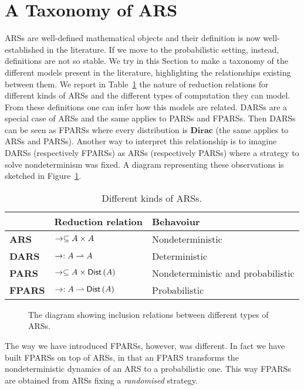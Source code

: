\section{A Taxonomy of ARS}
ARSs are well-defined mathematical objects and their definition is now well-established in the literature. If we move to the probabilistic setting, instead, definitions are not so stable. We try in this Section to make a taxonomy of the different models present in the literature, highlighting the relationships existing between them. We report in Table~\ref{table:ars} the nature of reduction relations for different kinds of ARSs and the different types of computation they can model. From these definitions one can infer how this models are related. DARSs are a special case of ARSs and the same applies to PARSs and FPARSs. Then DARSs can be seen as FPARSs where every distribution is $\textbf{Dirac}$ (the same applies to ARSs and PARSs). Another way to interpret this relationship is to imagine DARSs (respectively FPARSs) as ARSs (respectively PARSs) where a strategy to solve nondeterminism was fixed. A diagram representing these observations is sketched in Figure~\ref{figure:diagars}. 
\begin{table}
	\begin{tabular}{|l|l|l|}
		\hline 
		& \textbf{Reduction relation} & \textbf{Behavoiur}\tabularnewline
		\hline 
		\textbf{ARS} & $\rightarrow\subseteq A\times A$ & Nondeterministic\tabularnewline
		\hline 
		\textbf{DARS} & $\rightarrow:A\rightharpoonup A$ & Deterministic\tabularnewline
		\hline 
		\textbf{PARS} & $\rightarrow\subseteq A\times\textsf{Dist}\left(A\right)$ & Nondeterministic and probabilistic\tabularnewline
		\hline 
		\textbf{FPARS} & $\rightarrow:A\rightharpoonup\textsf{Dist}\left(A\right)$ & Probabilistic\tabularnewline
		\hline 
	\end{tabular}
	\caption{Different kinds of ARSs.}
	\label{table:ars}
\end{table}
\begin{figure}
	\caption{The diagram showing inclusion relations between different types of ARSs.}
	\label{figure:diagars}
\end{figure}
The way we have introduced FPARSs, however, was different. In fact we have built FPARSs on top of ARSs, in that an FPARS transforms the nondeterministic dynamics of an ARS to a probabilistic one. This way FPARSs are obtained from ARSs fixing a \emph{randomised} strategy.
